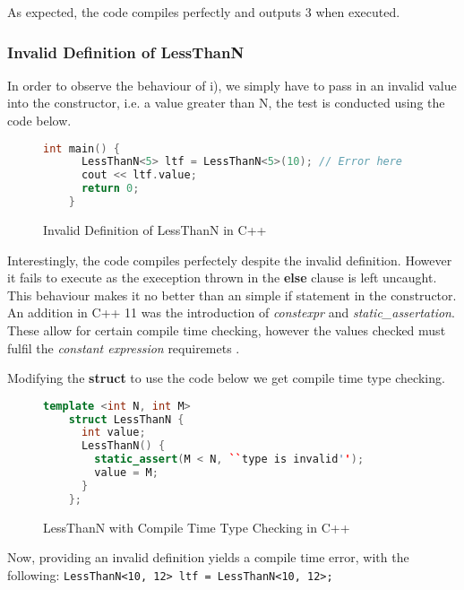 \documentclass[a4paper,12pt]{report}
\begin{document}
\par
As expected, the code compiles perfectly and outputs 3 when executed.

\subsubsection{Invalid Definition of LessThanN}
In order to observe the behaviour of i), we simply have to pass in an 
invalid value into the constructor, i.e. a value greater than N, 
the test is conducted using the code below. 

\begin{figure}[H]
  \begin{lstlisting}[language=c++]     
    int main() {
      LessThanN<5> ltf = LessThanN<5>(10); // Error here
      cout << ltf.value; 
      return 0;
    }
  \end{lstlisting}
  \caption{Invalid Definition of LessThanN in C++}
\end{figure}

\par
Interestingly, the code compiles perfectely despite the invalid definition. 
However it fails to execute as the exeception thrown in the \textbf{else} clause 
is left uncaught. This behaviour makes it no better than an simple if statement 
in the constructor. An addition in C++ 11 was the introduction of 
\textit{constexpr} and \textit{static\_assertation}. These allow for certain 
compile time checking, however the values checked must fulfil 
the \textit{constant expression} requiremets \cite{cppConstExpr}. 

\par
Modifying the \textbf{struct} to use the code below we get compile time type 
checking. 

\begin{figure}[H]
  \begin{lstlisting}[language=c++]     
    template <int N, int M>
    struct LessThanN {
      int value;
      LessThanN() {
        static_assert(M < N, ``type is invalid'');
        value = M;
      }
    };
  \end{lstlisting}
  \caption{LessThanN with Compile Time Type Checking in C++}
  \label{code:compileLTN}
\end{figure}

\par
Now, providing an invalid definition yields a compile time error, with the 
following: 
\verb+LessThanN<10, 12> ltf = LessThanN<10, 12>;+ 
\end{document}
